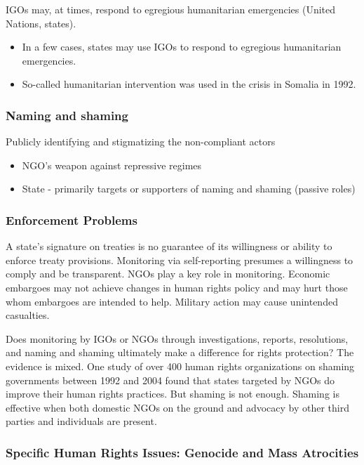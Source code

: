 \documentclass[
]{book}
\begin{document}
IGOs may, at times, respond to egregious humanitarian emergencies (United Nations, states).

\begin{itemize}
\item
  In a few cases, states may use IGOs to respond to egregious humanitarian emergencies.
\item
  So-called humanitarian intervention was used in the crisis in Somalia in 1992.
\end{itemize}

\hypertarget{naming-and-shaming}{%
\subsubsection{Naming and shaming}\label{naming-and-shaming}}

Publicly identifying and stigmatizing the non-compliant actors

\begin{itemize}
\item
  NGO's weapon against repressive regimes
\item
  State - primarily targets or supporters of naming and shaming (passive roles)
\end{itemize}

\hypertarget{enforcement-problems}{%
\subsubsection{Enforcement Problems}\label{enforcement-problems}}

A state's signature on treaties is no guarantee of its willingness or ability to enforce treaty provisions. Monitoring via self-reporting presumes a willingness to comply and be transparent. NGOs play a key role in monitoring. Economic embargoes may not achieve changes in human rights policy and may hurt those whom embargoes are intended to help. Military action may cause unintended casualties.

Does monitoring by IGOs or NGOs through investigations, reports, resolutions, and naming and shaming ultimately make a difference for rights protection? The evidence is mixed. One study of over 400 human rights organizations on shaming governments between 1992 and 2004 found that states targeted by NGOs do improve their human rights practices. But shaming is not enough. Shaming is effective when both domestic NGOs on the ground and advocacy by other third parties and individuals are present.

\hypertarget{specific-human-rights-issues-genocide-and-mass-atrocities}{%
\subsubsection{Specific Human Rights Issues: Genocide and Mass Atrocities}\label{specific-human-rights-issues-genocide-and-mass-atrocities}}
\end{document}
